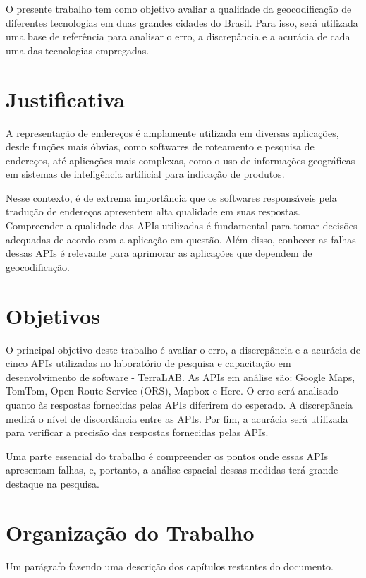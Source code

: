 O presente trabalho tem como objetivo avaliar a qualidade da geocodificação de diferentes tecnologias em duas grandes cidades do Brasil. Para isso, será utilizada uma base de referência para analisar o erro, a discrepância e a acurácia de cada uma das tecnologias empregadas.

\section{Justificativa}

A representação de endereços é amplamente utilizada em diversas aplicações, desde funções mais óbvias, como softwares de roteamento e pesquisa de endereços, até aplicações mais complexas, como o uso de informações geográficas em sistemas de inteligência artificial para indicação de produtos.

Nesse contexto, é de extrema importância que os softwares responsáveis pela tradução de endereços apresentem alta qualidade em suas respostas. Compreender a qualidade das APIs utilizadas é fundamental para tomar decisões adequadas de acordo com a aplicação em questão. Além disso, conhecer as falhas dessas APIs é relevante para aprimorar as aplicações que dependem de geocodificação.

\section{Objetivos}

O principal objetivo deste trabalho é avaliar o erro, a discrepância e a acurácia de cinco APIs utilizadas no laboratório de pesquisa e capacitação em desenvolvimento de software - TerraLAB. As APIs em análise são: Google Maps, TomTom, Open Route Service (ORS), Mapbox e Here. O erro será analisado quanto às respostas fornecidas pelas APIs diferirem do esperado. A discrepância medirá o nível de discordância entre as APIs. Por fim, a acurácia será utilizada para verificar a precisão das respostas fornecidas pelas APIs.

Uma parte essencial do trabalho é compreender os pontos onde essas APIs apresentam falhas, e, portanto, a análise espacial dessas medidas terá grande destaque na pesquisa.

\section{Organização do Trabalho}

Um parágrafo fazendo uma descrição dos capítulos restantes do documento. 


